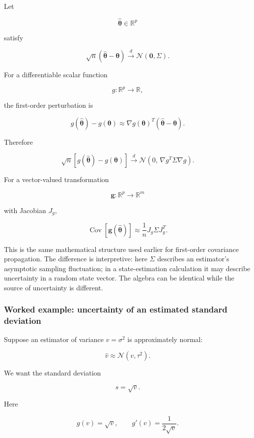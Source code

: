 Let

\[
\widehat{\boldsymbol\theta}\in\mathbb R^p
\]

satisfy

\[
\sqrt n
(\widehat{\boldsymbol\theta}-\boldsymbol\theta)
\xrightarrow{d}
\mathcal N(\mathbf 0,\Sigma).
\]

For a differentiable scalar function

\[
g:\mathbb R^p\to\mathbb R,
\]

the first-order perturbation is

\[
g(\widehat{\boldsymbol\theta})
-
g(\boldsymbol\theta)
\approx
\nabla g(\boldsymbol\theta)^T
(\widehat{\boldsymbol\theta}-\boldsymbol\theta).
\]

Therefore

\[
\boxed{
\sqrt n
\left[
g(\widehat{\boldsymbol\theta})
-
g(\boldsymbol\theta)
\right]
\xrightarrow{d}
\mathcal N
\left(
0,\,
\nabla g^T
\Sigma
\nabla g
\right)
}.
\]

For a vector-valued transformation

\[
\mathbf g:\mathbb R^p\to\mathbb R^m
\]

with Jacobian \(J_g\),

\[
\boxed{
\operatorname{Cov}
\left[
\mathbf g(\widehat{\boldsymbol\theta})
\right]
\approx
\frac1n
J_g
\Sigma
J_g^T
}.
\]

This is the same mathematical structure used earlier for first-order covariance propagation. The difference is interpretive: here \(\Sigma\) describes an estimator's asymptotic sampling fluctuation; in a state-estimation calculation it may describe uncertainty in a random state vector. The algebra can be identical while the source of uncertainty is different.

\subsubsection{Worked example: uncertainty of an estimated standard deviation}\label{02-foundations-ii-ch030-worked-example-uncertainty-of-an-estimated-standard-deviation}

Suppose an estimator of variance \(v=\sigma^2\) is approximately normal:

\[
\widehat v
\approx
\mathcal N(v,\tau^2).
\]

We want the standard deviation

\[
s=\sqrt v.
\]

Here

\[
g(v)=\sqrt v,
\qquad
g'(v)=\frac{1}{2\sqrt v}.
\]

